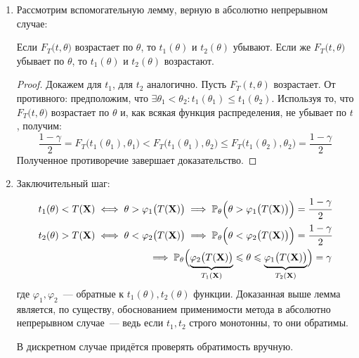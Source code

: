 \begin{enumerate}
    \item Рассмотрим вспомогательную лемму, верную в абсолютно непрерывном случае:
        \begin{lem}
            Если $F_{T}\bigl(t, \theta\bigr)$ возрастает по $\theta$, то $t_{1}(\theta)$ и $t_{2}(\theta)$ убывают. 
            Если же $F_{T}\bigl(t, \theta\bigr)$ убывает по $\theta$, то $t_{1}(\theta)$ и $t_{2}(\theta)$ возрастают.
        \end{lem}
        \begin{proof}
            Докажем для $t_1$, для $t_2$ аналогично.
            Пусть $F_{T}(t, \theta)$ возрастает.
            От противного: предположим, что $\exists \theta_{1}<\theta_{2} \colon t_{1}\left(\theta_{1}\right) \leqslant t_{1}\left(\theta_{2}\right)$.
            Используя то, что $F_{T}\bigl(t, \theta\bigr)$ возрастает по $\theta$ и, как всякая функция распределения, не убывает по $t$, получим:
            \begin{equation*}
                \frac{1-\gamma}{2} = 
                F_{T}\bigl(t_{1}(\theta_{1}), \theta_{1}\bigr) < 
                F_{T}\bigl(t_{1}(\theta_{1}), \theta_{2}\bigr) \leqslant 
                F_{T}\bigl(t_{1}(\theta_{2}), \theta_{2}\bigr) = 
                \frac{1-\gamma}{2}
            \end{equation*}
            Полученное противоречие завершает доказательство.
        \end{proof}
    \item %
        Заключительный шаг:
        \begin{equation*}
            \begin{aligned}
                t_{1}(\theta) < T(\mathbf{X})
                \iff \theta > \varphi_{1} \bigl(T(\mathbf{X})\bigr)
                \implies 
                \operatorname{\operatorname{\mathbb{P}}_{\theta}}\Bigl(\theta>\varphi_{1} \bigl(T(\mathbf{X})\bigr)\Bigr)
                = \cfrac{1-\gamma}{2} \\
                t_{2}(\theta) > T(\mathbf{X}) 
                \iff \theta < \varphi_{2} \bigl(T(\mathbf{X})\bigr) 
                \implies 
                \operatorname{\operatorname{\mathbb{P}}_{\theta}}\Bigl(\theta < \varphi_{2}\bigl(T(\mathbf{X})\bigr)\Bigr)
                = \cfrac{1-\gamma}{2} \\
                \implies 
                \operatorname{\operatorname{\mathbb{P}}_{\theta}} \Bigl(\underbrace{\varphi_{2} \bigl(T(\mathbf{X})\bigr)}_{T_{1}(\mathbf{X})} 
                \leqslant \theta 
                \leqslant \underbrace{\varphi_{1}\bigl(T(\mathbf{X})\bigr)}_{T_{2}(\mathbf{X})} \Bigr)
                = \gamma
            \end{aligned}
        \end{equation*}
        где $\varphi_1, \varphi_2$~--- обратные к $t_1(\theta), t_2(\theta)$ функции. 
        Доказанная выше лемма является, по существу, обоснованием применимости метода в абсолютно непрерывном случае~--- 
        ведь если $t_1, t_2$ строго монотонны, то они обратимы.

        В дискретном случае придётся проверять обратимость вручную.
\end{enumerate}